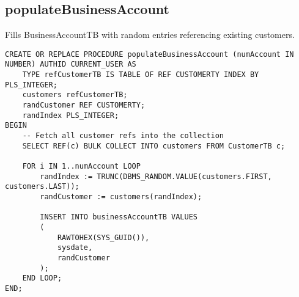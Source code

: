 \subsection*{populateBusinessAccount}
Fills BusinessAccountTB with random entries referencing existing customers.
\begin{lstlisting}
CREATE OR REPLACE PROCEDURE populateBusinessAccount (numAccount IN NUMBER) AUTHID CURRENT_USER AS
    TYPE refCustomerTB IS TABLE OF REF CUSTOMERTY INDEX BY PLS_INTEGER;
    customers refCustomerTB;    
    randCustomer REF CUSTOMERTY;
    randIndex PLS_INTEGER;
BEGIN
    -- Fetch all customer refs into the collection
    SELECT REF(c) BULK COLLECT INTO customers FROM CustomerTB c;

    FOR i IN 1..numAccount LOOP
        randIndex := TRUNC(DBMS_RANDOM.VALUE(customers.FIRST, customers.LAST));
        randCustomer := customers(randIndex);

        INSERT INTO businessAccountTB VALUES
        (
            RAWTOHEX(SYS_GUID()),
            sysdate,
            randCustomer
        );
    END LOOP;
END;
\end{lstlisting}

